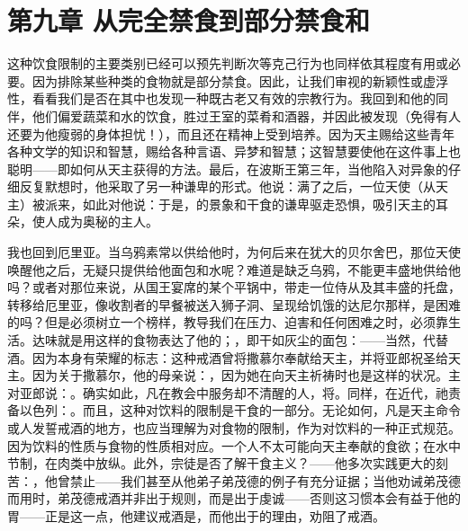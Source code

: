 
\section{第九章 从完全禁食到部分禁食和}

这种饮食限制的主要类别已经可以预先判断次等克己行为也同样依其程度有用或必要。因为排除某些种类的食物就是部分禁食。因此，让我们审视的新颖性或虚浮性，看看我们是否在其中也发现一种既古老又有效的宗教行为。我回到和他的同伴，他们偏爱蔬菜和水的饮食，胜过王室的菜肴和酒器，并因此被发现（免得有人还要为他瘦弱的身体担忧！），而且还在精神上受到培养。因为天主赐给这些青年各种文学的知识和智慧，赐给各种言语、异梦和智慧；这智慧要使他在这件事上也聪明——即如何从天主获得的方法。最后，在波斯王第三年，当他陷入对异象的仔细反复默想时，他采取了另一种谦卑的形式。他说：满了之后，一位天使（从天主）被派来，如此对他说：于是，的景象和干食的谦卑驱走恐惧，吸引天主的耳朵，使人成为奥秘的主人。\par

我也回到厄里亚。当乌鸦素常以供给他时，为何后来在犹大的贝尔舍巴，那位天使唤醒他之后，无疑只提供给他面包和水呢？难道是缺乏乌鸦，不能更丰盛地供给他吗？或者对那位来说，从国王宴席的某个平锅中，带走一位侍从及其丰盛的托盘，转移给厄里亚，像收割者的早餐被送入狮子洞、呈现给饥饿的达尼尔那样，是困难的吗？但是必须树立一个榜样，教导我们在压力、迫害和任何困难之时，必须靠生活。达味就是用这样的食物表达了他的；，即干如灰尘的面包：——当然，代替酒。因为本身有荣耀的标志：这种戒酒曾将撒慕尔奉献给天主，并将亚郎祝圣给天主。因为关于撒慕尔，他的母亲说：，因为她在向天主祈祷时也是这样的状况。主对亚郎说：。确实如此，凡在教会中服务却不清醒的人，将。同样，在近代，祂责备以色列：。而且，这种对饮料的限制是干食的一部分。无论如何，凡是天主命令或人发誓戒酒的地方，也应当理解为对食物的限制，作为对饮料的一种正式规范。因为饮料的性质与食物的性质相对应。一个人不太可能向天主奉献的食欲；在水中节制，在肉类中放纵。此外，宗徒是否了解干食主义？——他多次实践更大的刻苦：，他曾禁止——我们甚至从他弟子弟茂德的例子有充分证据；当他劝诫弟茂德而用时，弟茂德戒酒并非出于规则，而是出于虔诚——否则这习惯本会有益于他的胃——正是这一点，他建议戒酒是，而他出于的理由，劝阻了戒酒。\par

